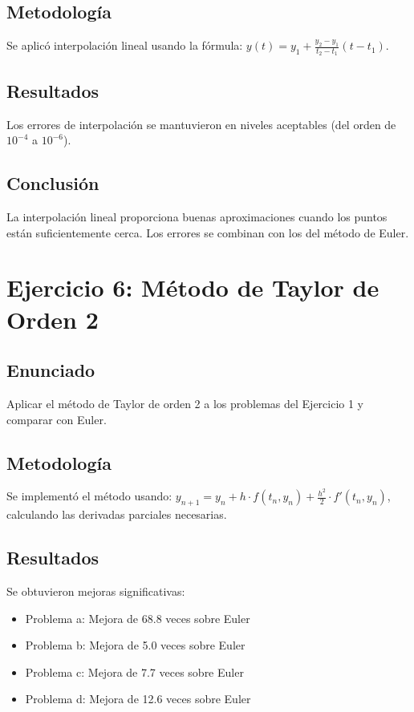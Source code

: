 \documentclass[12pt,a4paper]{article}
\begin{document}
\subsection{Metodología}
Se aplicó interpolación lineal usando la fórmula: $y(t) = y_1 + \frac{y_2 - y_1}{t_2 - t_1}(t - t_1)$.

\subsection{Resultados}
Los errores de interpolación se mantuvieron en niveles aceptables (del orden de $10^{-4}$ a $10^{-6}$).

\subsection{Conclusión}
La interpolación lineal proporciona buenas aproximaciones cuando los puntos están suficientemente cerca. Los errores se combinan con los del método de Euler.

\section{Ejercicio 6: Método de Taylor de Orden 2}

\subsection{Enunciado}
Aplicar el método de Taylor de orden 2 a los problemas del Ejercicio 1 y comparar con Euler.

\subsection{Metodología}
Se implementó el método usando: $y_{n+1} = y_n + h \cdot f(t_n, y_n) + \frac{h^2}{2} \cdot f'(t_n, y_n)$, calculando las derivadas parciales necesarias.

\subsection{Resultados}
Se obtuvieron mejoras significativas:
\begin{itemize}
    \item Problema a: Mejora de 68.8 veces sobre Euler
    \item Problema b: Mejora de 5.0 veces sobre Euler
    \item Problema c: Mejora de 7.7 veces sobre Euler
    \item Problema d: Mejora de 12.6 veces sobre Euler
\end{itemize}
\end{document}
